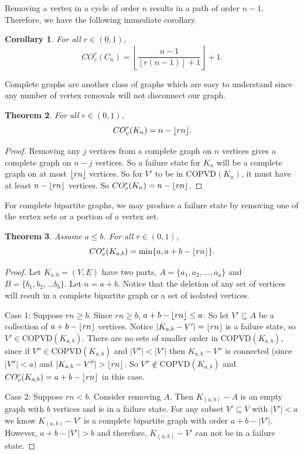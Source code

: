 \documentclass[12pt]{article}
\DeclarePairedDelimiter{\floor}{\lfloor}{\rfloor}
\newtheorem{theorem}{Theorem}[section]
\newtheorem{corollary}[theorem]{Corollary}
\theoremstyle{definition}
\newcommand{\COVDS}{\text{COPVD}}
\newcommand{\COV}[2]{CO^{#1}_{v}(#2)}
\begin{document}
Removing a vertex in a cycle of order $n$ results in a path of order $n-1$. Therefore, we have the following immediate corollary. 

\begin{corollary}
 For all $r \in (0,1)$, $$CO_v^{r}(C_n)=\left\lfloor \dfrac{n-1}{\left\lfloor r(n-1)\right\rfloor+1} \right\rfloor+1.$$ 
\end{corollary}

Complete graphs are another class of graphs which are easy to understand since any number of vertex removals will not disconnect our graph. 

\begin{theorem}
 For all $r \in (0,1)$,$$\COV{r}{K_{n}}=n-\floor{rn}.$$ 
\end{theorem}

\begin{proof}
Removing any $j$ vertices from a complete graph on $n$ vertices gives a complete graph on $n-j$ vertices. So a failure state for $K_{n}$ will be a complete graph on at most $\floor{rn}$ vertices. So for $V'$ to be in $\COVDS(K_{n})$, it must have at least $n-\floor{rn}$ vertices. So $CO_{v}^{r}(K_{n})=n-\floor{rn}$.
\end{proof}

For complete bipartite graphs, we may produce a failure state by removing one of the vertex sets or a portion of a vertex set.

\begin{theorem}
 Assume $a\leq b$. For all $r \in (0,1)$,$$\COV{r}{K_{a,b}}=\min\{a, a+b-\floor{rn}\}.$$ 
\end{theorem}

\begin{proof}
Let $K_{a,b}=(V,E)$ have two parts, $A = \{a_1, a_2, \ldots, a_a\}$ and $B = \{b_1, b_2, \ldots b_b\}$. Let $n=a+b$. Notice that the deletion of any set of vertices will result in a complete bipartite graph or a set of isolated vertices. 

Case 1: Suppose $rn\ge b$. Since $rn\ge b$, $a+b-\floor{rn}\le a$. So let $V'\subseteq A$ be a collection of $a+b-\floor{rn}$ vertices. Notice $|K_{a,b}-V'|=\floor{rn}$ is a failure state, so $V'\in\COVDS(K_{a,b})$. There are no sets of smaller order in $\COVDS(K_{a,b})$, since if $V''\in \COVDS(K_{a,b})$ and $|V''|<|V'|$ then $K_{a,b}-V''$ is connected (since $|V''|<a$) and $|K_{a,b}-V''|>\floor{rn}$. So $V''\notin \COVDS(K_{a,b})$ and $\COV{r}{K_{a,b}}=a+b-\floor{rn}$ in this case.


Case 2: Suppose $rn < b.$ Consider removing $A$. Then $K_{(a,b)} - A$ is an empty graph with $b$ vertices and is in a failure state. For any subset $V'\subseteq V$ with $|V'| <a$ we know $K_{(a,b)}-V'$ is a complete bipartite graph with order $a+b-|V'|$. However, $a+b-|V'| > b$ and therefore, $K_{(a,b)} -V'$ can not be in a failure state. 
\end{proof}
\end{document}
